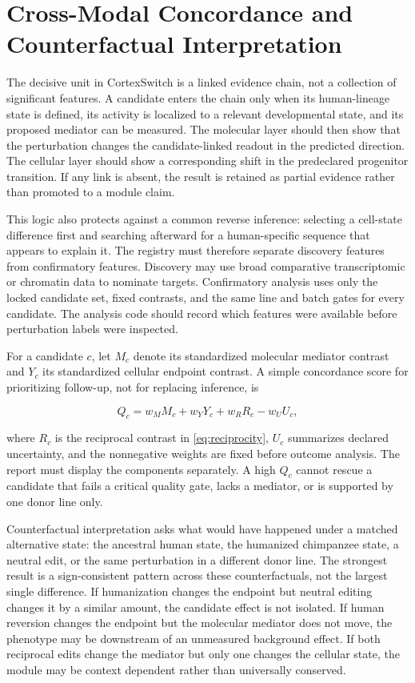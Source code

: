 \documentclass[conference]{IEEEtran}
\newcommand{\csw}{CortexSwitch}
\begin{document}
\section{Cross-Modal Concordance and Counterfactual Interpretation}

The decisive unit in \csw{} is a linked evidence chain, not a collection of significant features. A candidate enters the chain only when its human-lineage state is defined, its activity is localized to a relevant developmental state, and its proposed mediator can be measured. The molecular layer should then show that the perturbation changes the candidate-linked readout in the predicted direction. The cellular layer should show a corresponding shift in the predeclared progenitor transition. If any link is absent, the result is retained as partial evidence rather than promoted to a module claim.

This logic also protects against a common reverse inference: selecting a cell-state difference first and searching afterward for a human-specific sequence that appears to explain it. The registry must therefore separate discovery features from confirmatory features. Discovery may use broad comparative transcriptomic or chromatin data to nominate targets. Confirmatory analysis uses only the locked candidate set, fixed contrasts, and the same line and batch gates for every candidate. The analysis code should record which features were available before perturbation labels were inspected.

For a candidate \(c\), let \(M_c\) denote its standardized molecular mediator contrast and \(Y_c\) its standardized cellular endpoint contrast. A simple concordance score for prioritizing follow-up, not for replacing inference, is

\begin{equation}
Q_c=w_M M_c+w_Y Y_c+w_R R_c-w_U U_c,
\label{eq:concordance}
\end{equation}

where \(R_c\) is the reciprocal contrast in \eqref{eq:reciprocity}, \(U_c\) summarizes declared uncertainty, and the nonnegative weights are fixed before outcome analysis. The report must display the components separately. A high \(Q_c\) cannot rescue a candidate that fails a critical quality gate, lacks a mediator, or is supported by one donor line only.

Counterfactual interpretation asks what would have happened under a matched alternative state: the ancestral human state, the humanized chimpanzee state, a neutral edit, or the same perturbation in a different donor line. The strongest result is a sign-consistent pattern across these counterfactuals, not the largest single difference. If humanization changes the endpoint but neutral editing changes it by a similar amount, the candidate effect is not isolated. If human reversion changes the endpoint but the molecular mediator does not move, the phenotype may be downstream of an unmeasured background effect. If both reciprocal edits change the mediator but only one changes the cellular state, the module may be context dependent rather than universally conserved.
\end{document}
